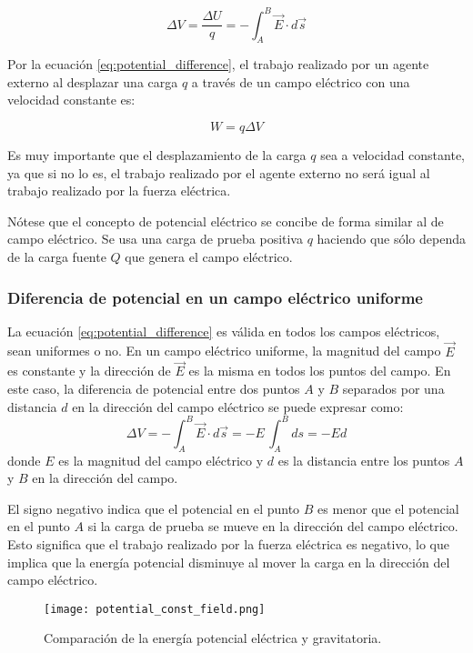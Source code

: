 \begin{equation}
    \Delta V = \frac{\Delta U}{q} = -\int_A^B \vec{E} \cdot d\vec{s}
    \label{eq:potential_difference}
\end{equation}

Por la ecuación \eqref{eq:potential_difference}, el trabajo realizado por un agente externo al desplazar una carga \(q\) a través de un campo eléctrico con una velocidad constante es:

\[
W=q\Delta V
\]

Es muy importante que el desplazamiento de la carga \(q\) sea a velocidad constante, ya que si no lo es, el trabajo realizado por el agente externo no será igual al trabajo realizado por la fuerza eléctrica. 

Nótese que el concepto de potencial eléctrico se concibe de forma similar al de campo eléctrico. Se usa una carga de prueba positiva \(q\) haciendo que sólo dependa de la carga fuente \(Q\) que genera el campo eléctrico. 

\subsubsection{Diferencia de potencial en un campo eléctrico uniforme}

La ecuación \eqref{eq:potential_difference} es válida en todos los campos eléctricos, sean uniformes o no. En un campo eléctrico uniforme, la magnitud del campo \(\vec{E}\) es constante y la dirección de \(\vec{E}\) es la misma en todos los puntos del campo. En este caso, la diferencia de potencial entre dos puntos \(A\) y \(B\) separados por una distancia \(d\) en la dirección del campo eléctrico se puede expresar como:
\begin{equation}
    \Delta V = -\int_A^B \vec{E} \cdot d\vec{s} = -E \, \int_A^B ds = \boxed{-Ed}
    \label{eq:potential_uniform}
\end{equation}
donde \(E\) es la magnitud del campo eléctrico y \(d\) es la distancia entre los puntos \(A\) y \(B\) en la dirección del campo.

El signo negativo indica que el potencial en el punto \(B\) es menor que el potencial en el punto \(A\) si la carga de prueba se mueve en la dirección del campo eléctrico. Esto significa que el trabajo realizado por la fuerza eléctrica es negativo, lo que implica que la energía potencial disminuye al mover la carga en la dirección del campo eléctrico.

\begin{figure}[ht]
    \centering
    \texttt{[image: potential\_const\_field.png]}
    \caption{Comparación de la energía potencial eléctrica y gravitatoria.}
    \label{fig:potential_uniform}
\end{figure}

